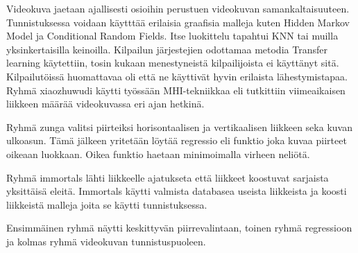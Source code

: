 Videokuva jaetaan ajallisesti osioihin perustuen videokuvan samankaltaisuuteen. Tunnistuksessa voidaan käytttää erilaisia graafisia malleja
kuten Hidden Markov Model ja Conditional Random Fields. Itse luokittelu tapahtui KNN tai muilla yksinkertaisilla keinoilla. 
Kilpailun järjestejien odottamaa metodia Transfer learning käytettiin, tosin kukaan menestyneistä kilpailijoista ei käyttänyt sitä.\\

Kilpailutöissä huomattavaa oli että ne käyttivät hyvin erilaista lähestymistapaa. 
Ryhmä xiaozhuwudi käytti työssään MHI-tekniikkaa eli tutkittiin viimeaikaisen liikkeen määrää videokuvassa eri ajan hetkinä.

Ryhmä zunga valitsi piirteiksi horisontaalisen ja vertikaalisen liikkeen seka kuvan ulkoasun. Tämä jälkeen yritetään löytää
regressio eli funktio joka kuvaa piirteet oikeaan luokkaan. Oikea funktio haetaan minimoimalla virheen neliötä.

Ryhmä immortals lähti liikkeelle ajatukseta että liikkeet koostuvat sarjaista yksittäisä eleitä.
Immortals käytti valmista databasea useista liikkeista ja koosti liikkeistä malleja joita se käytti tunnistuksessa.

Ensimmäinen ryhmä näytti keskittyvän piirrevalintaan, toinen ryhmä regressioon ja kolmas ryhmä videokuvan tunnistuspuoleen.

